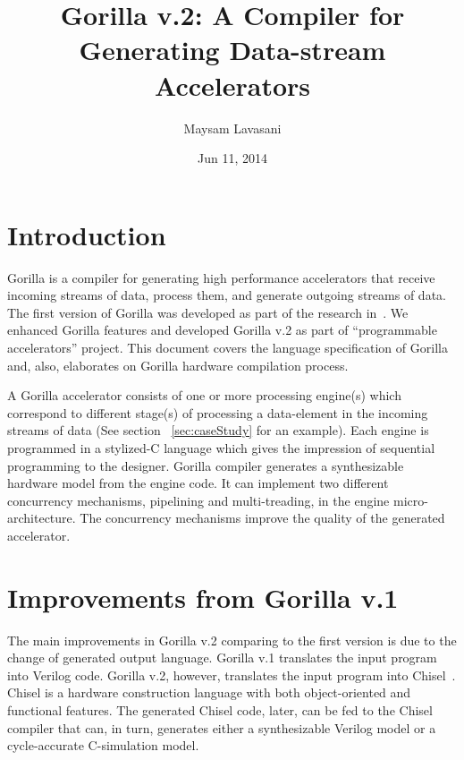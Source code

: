 \documentclass[a4paper, 12pt]{report}
\begin{document}
\title{Gorilla v.2: A Compiler for Generating Data-stream Accelerators}
\author{Maysam Lavasani}         
\date{Jun 11, 2014}    %
\maketitle

\renewcommand{\thesection}{\arabic{section}}
\small
\setcounter{tocdepth}{4}
\tableofcontents
\normalsize

\section{Introduction}
Gorilla is a compiler for generating high performance 
accelerators that receive incoming streams of data, 
process them, and generate outgoing streams of data. 
The first version of Gorilla was developed as part of the 
research in~\cite{GorillaFPGA2012}. We enhanced Gorilla 
features and developed Gorilla v.2 as part of  
``programmable accelerators'' project. This document 
covers the language specification of Gorilla and, 
also, elaborates on Gorilla hardware compilation process. 

A Gorilla accelerator consists of one or more
processing engine(s) which correspond to different 
stage(s) of processing a data-element in the incoming 
streams of data (See section ~\ref{sec:caseStudy} for 
an example). Each engine is programmed in a stylized-C 
language which gives the impression of sequential 
programming to the designer. Gorilla compiler generates 
a synthesizable hardware model from the engine code. It 
can implement two different concurrency 
mechanisms, pipelining and multi-treading, in the engine 
micro-architecture. The concurrency mechanisms improve 
the quality of the generated accelerator.

\section{Improvements from Gorilla v.1}
The main improvements in Gorilla v.2 comparing to the 
first version is due to the change of generated output 
language. Gorilla v.1 translates the input program  into 
Verilog code. Gorilla v.2, however, translates the input 
program into Chisel~\cite{ChiselDAC2012}. Chisel is a 
hardware construction language with both object-oriented 
and functional features. The generated Chisel code, later, 
can be fed to the Chisel compiler that can, in turn, 
generates either a synthesizable Verilog model or a 
cycle-accurate C-simulation model.
\end{document}

